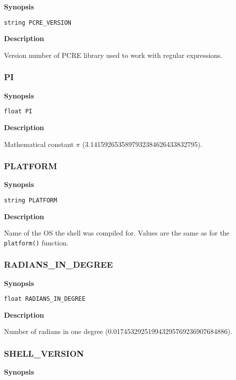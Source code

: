 \documentclass[a4paper, 10pt, titlepage]{article}
\begin{document}
\textbf{Synopsis}

\begin{verbatim}
string PCRE_VERSION
\end{verbatim}

\textbf{Description}

Version number of PCRE library used to work with regular expressions.

\subsubsection{PI}

\textbf{Synopsis}

\begin{verbatim}
float PI
\end{verbatim}

\textbf{Description}

Mathematical constant $\pi$ (3.1415926535897932384626433832795).

\subsubsection{PLATFORM}

\textbf{Synopsis}

\begin{verbatim}
string PLATFORM
\end{verbatim}

\textbf{Description}

Name of the OS the shell was compiled for. Values are the same as for the \texttt{platform()} function.

\subsubsection{RADIANS\_IN\_DEGREE}

\textbf{Synopsis}

\begin{verbatim}
float RADIANS_IN_DEGREE
\end{verbatim}

\textbf{Description}

Number of radians in one degree (0.017453292519943295769236907684886).

\subsubsection{SHELL\_VERSION}

\textbf{Synopsis}
\end{document}
